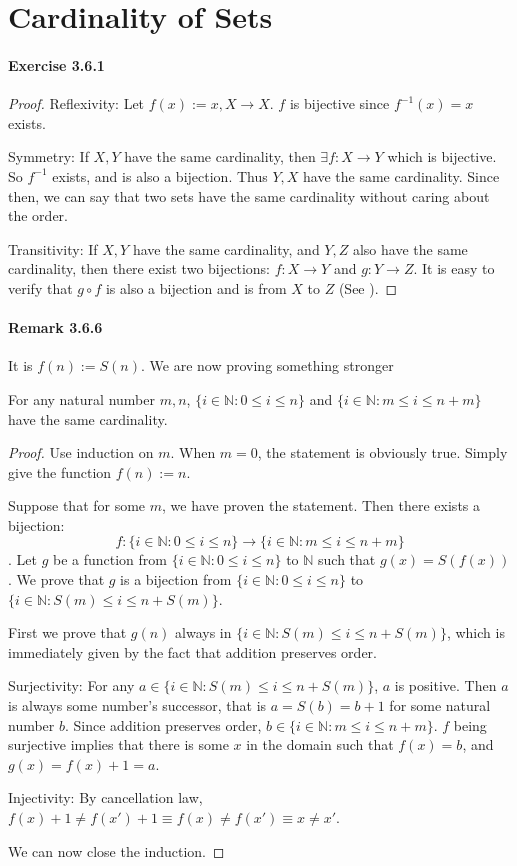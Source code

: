 \section{Cardinality of Sets}

\paragraph{Exercise 3.6.1} \label{exercise3.6.1}
\begin{proof}
Reflexivity: Let $f(x):= x, X \rightarrow X$. $f$ is bijective since $f^{-1}(x) = x$ exists.

Symmetry: If $X,Y$ have the same cardinality, then $\exists f:X\rightarrow Y$ which is bijective. So 
$f^{-1}$ exists, and is also a bijection. Thus $Y,X$ have the same cardinality. Since then, we can say 
that two sets have the same cardinality without caring about the order.

Transitivity: If $X,Y$ have the same cardinality, and $Y,Z$ also have the same cardinality, then there 
exist two bijections: $f:X \rightarrow Y$ and $g:Y \rightarrow Z$. It is easy to verify that $g \circ f$ 
is also a bijection and is from $X$ to $Z$ (See ).
\end{proof}

\paragraph{Remark 3.6.6}
It is $f(n) := S(n)$. We are now proving something stronger
\begin{lem} \label{lem3.6.6}
For any natural number $m,n$, $\{i \in \mathbb{N}:0\leq i\leq n\}$ and 
$\{i \in \mathbb{N}:m\leq i\leq n+m\}$ have the same cardinality.
\end{lem}
\begin{proof}
Use induction on $m$. When $m=0$, the statement is obviously true. Simply give the function $f(n):=n$.

Suppose that for some $m$, we have proven the statement. Then there exists a bijection: 
\[
f:\{i \in \mathbb{N}:0\leq i\leq n\} \rightarrow \{i \in \mathbb{N}:m\leq i\leq n+m\}
\].
Let $g$ be a function from $\{i \in \mathbb{N}:0\leq i\leq n\}$ to $\mathbb{N}$ such that 
$g(x) = S(f(x))$. We prove that $g$ is a bijection from $\{i \in \mathbb{N}:0\leq i\leq n\}$ to 
$\{i \in \mathbb{N}:S(m)\leq i\leq n+S(m)\}$.

First we prove that $g(n)$ always in $\{i \in \mathbb{N}:S(m)\leq i\leq n+S(m)\}$, which is immediately 
given by the fact that addition preserves order. 

Surjectivity: For any $a \in \{i \in \mathbb{N}:S(m)\leq i\leq n+S(m)\}$, $a$ is positive. Then $a$ is 
always some number's successor, that is $a = S(b) = b+1$ for some natural number $b$. Since addition 
preserves order, $b \in \{i \in \mathbb{N}:m\leq i\leq n+m\}$. $f$ being surjective implies that there is 
some $x$ in the domain such that $f(x) = b$, and $g(x) = f(x) + 1 = a$.

Injectivity: By cancellation law, $f(x) + 1 \neq f(x') + 1 \equiv f(x) \neq f(x') \equiv x \neq x'$.

We can now close the induction.
\end{proof}

